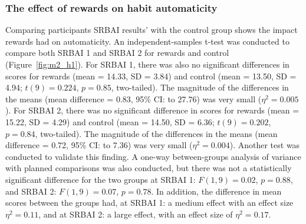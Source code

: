 \documentclass{scaffold/sigchi}
\begin{document}
\subsubsection{The effect of rewards on habit automaticity}
Comparing participants SRBAI results' with the control group shows the impact rewards had on automaticity.
An independent-samples t-test was conducted to compare both SRBAI 1 and SRBAI 2 for rewards and control (Figure~\ref{fig:m2_h1}). For SRBAI 1, there was also no significant differences in scores for rewards (mean = 14.33, SD = 3.84) and control (mean = 13.50, SD = 4.94; $t(9) = 0.224$, $p = 0.85$,
two-tailed). The magnitude of the differences in the means (mean difference = 0.83,
95\% CI:  to 27.76) was very small ($\eta^{2} = 0.005$). For SRBAI 2, there was no significant difference in scores for rewards
(mean = 15.22, SD = 4.29) and control (mean = 14.50, SD = 6.36; $t(9) = 0.202$, $p = 0.84$,
two-tailed). The magnitude of the differences in the means (mean difference = 0.72,
95\% CI:  to 7.36) was very small ($\eta^{2} = 0.004$). Another test was conducted to validate this finding. A one-way between-groups analysis of variance with planned comparisons was also conducted, but there was not a statistically significant difference for the two groups at SRBAI 1: $F(1,9) = 0.02$, $p = 0.88$, and SRBAI 2: $F(1,9) = 0.07$, $p = 0.78$. In addition, the difference in mean scores between the groups had, at SRBAI 1: a medium effect with an effect size $\eta^{2} = 0.11$, and at SRBAI 2: a large effect, with an effect size of $\eta^{2} = 0.17$.

\end{document}

